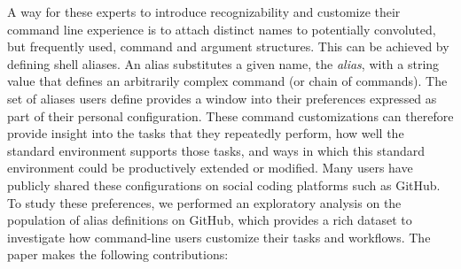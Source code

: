 A way for these experts to introduce recognizability and customize their command line experience is to attach distinct names to potentially convoluted, but frequently used, command and argument structures.
This can be achieved by defining shell aliases.
An alias substitutes a given name, the \emph{alias}, with a string value that defines an arbitrarily complex command (or chain of commands).
The set of aliases users define provides a window into their preferences expressed as part of their personal configuration.
These command customizations can therefore provide insight into the tasks that they repeatedly perform, how well the standard environment supports those tasks, and ways in which this standard environment could be productively extended or modified.
Many users have publicly shared these configurations on social coding platforms such as GitHub.
To study these preferences, we performed an exploratory analysis on the population of alias definitions on GitHub, which provides a rich dataset to investigate how command-line users customize their tasks and workflows. The paper makes the following contributions:
